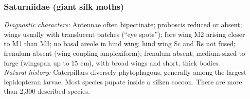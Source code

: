\documentclass[letterpaper, 11pt]{article}
\begin{document}
\subsubsection{Saturniidae (giant silk moths)}
\noindent{}\textit{Diagnostic characters:} Antennae often bipectinate; proboscis reduced or absent; wings usually with translucent patches (``eye spots''); fore wing M2 arising closer to M1 than M3; no basal areole in hind wing; hind wing Sc and Rs not fused; frenulum absent (wing coupling amplexiform); frenulum absent; medium-sized to large (wingspan up to 15 cm), with broad wings and short, thick bodies.\\

\noindent{}\textit{Natural history:} Caterpillars diversely phytophagous, generally among the largest lepidopteran larvae. Most species pupate inside a silken cocoon. There are more than 2,300 described species.
\end{document}

